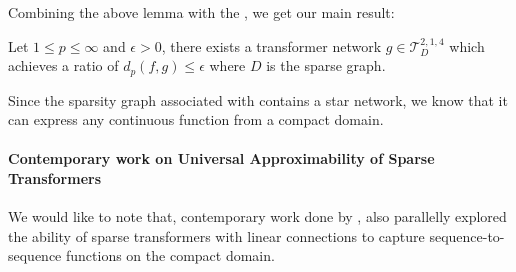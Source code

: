 Combining the above lemma with the , we get our main result:
\begin{theorem}
    Let $1\leq p \leq \infty$ and $\epsilon > 0$, there exists a transformer network 
    $g \in \mathcal{T}_D^{2,1,4}$
    which achieves a ratio of $d_{p}(f,g) \leq \epsilon$ where $D$ is the sparse graph. 
\end{theorem}


Since the sparsity graph associated with \bigb contains a star network, we know that it 
can express any continuous function from a compact domain.


\paragraph{Contemporary work on Universal Approximability of Sparse Transformers}
We would like to note that, contemporary work done by \citet{yun2020on}, also parallelly explored the ability of sparse transformers with linear connections to capture sequence-to-sequence functions on the compact domain.
 